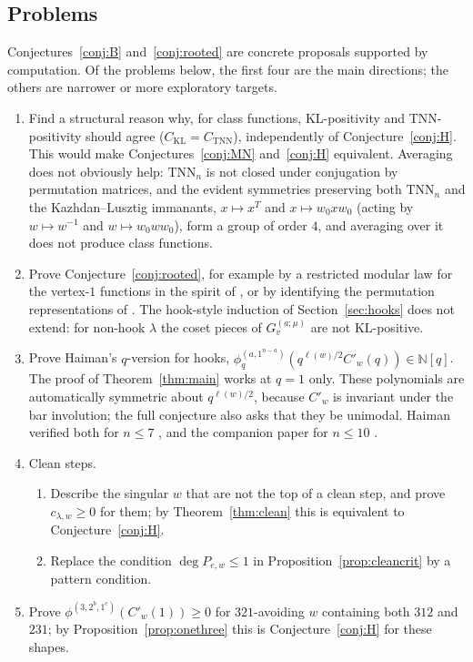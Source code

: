 \documentclass[11pt]{amsart}
\theoremstyle{definition}
\theoremstyle{remark}
\newcommand{\N}{\mathbb{N}}
\newcommand{\TNN}{\mathrm{TNN}}
\newcommand{\CKL}{C_{\mathrm{KL}}}
\newcommand{\CTNN}{C_{\mathrm{TNN}}}
\newcommand{\Cp}[1]{C'_{#1}(1)}
\begin{document}
\subsection{Problems}
Conjectures~\ref{conj:B} and~\ref{conj:rooted} are concrete proposals supported by computation. Of the problems below, the first four are the main directions; the others are narrower or more exploratory targets.
\begin{enumerate}
\item\label{prob:KT} Find a structural reason why, for class functions, KL-positivity and TNN-positivity should agree ($\CKL=\CTNN$), independently of Conjecture~\ref{conj:H}. This would make Conjectures~\ref{conj:MN} and~\ref{conj:H} equivalent. Averaging does not obviously help: $\TNN_n$ is not closed under conjugation by permutation matrices, and the evident symmetries preserving both $\TNN_n$ and the Kazhdan--Lusztig immanants, $x\mapsto x^T$ and $x\mapsto w_0xw_0$ (acting by $w\mapsto w^{-1}$ and $w\mapsto w_0ww_0$), form a group of order $4$, and averaging over it does not produce class functions.
\item Prove Conjecture~\ref{conj:rooted}, for example by a restricted modular law for the vertex-$1$ functions in the spirit of \cite{HHKKO}, or by identifying the permutation representations of \cite[Conj.~1.4]{AN22b}. The hook-style induction of Section~\ref{sec:hooks} does not extend: for non-hook $\lambda$ the coset pieces of $G^{(a;\mu)}_v$ are not KL-positive.
\item\label{prob:q} Prove Haiman's $q$-version for hooks, $\phi^{(a,1^{n-a})}_q(q^{\ell(w)/2}C'_w(q))\in\N[q]$. The proof of Theorem~\ref{thm:main} works at $q=1$ only. These polynomials are automatically symmetric about $q^{\ell(w)/2}$, because $C'_w$ is invariant under the bar involution; the full conjecture \cite[Conj.~2.1]{Hai} also asks that they be unimodal. Haiman verified both for $n\le7$ \cite{Hai}, and the companion paper for $n\le10$ \cite{McN}.
\item\label{prob:clean} Clean steps.
  \begin{enumerate}
  \item Describe the singular $w$ that are not the top of a clean step, and prove $c_{\lambda,w}\ge0$ for them; by Theorem~\ref{thm:clean} this is equivalent to Conjecture~\ref{conj:H}.
  \item Replace the condition $\deg P_{e,w}\le1$ in Proposition~\ref{prop:cleancrit} by a pattern condition.
  \end{enumerate}
\item Prove $\phi^{(3,2^b,1^c)}(\Cp w)\ge0$ for $321$-avoiding $w$ containing both $312$ and $231$; by Proposition~\ref{prop:onethree} this is Conjecture~\ref{conj:H} for these shapes.

\end{enumerate}
\end{document}
